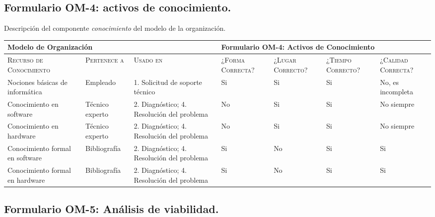 \documentclass[12pt,a4paper,twoside,spanish]{article}      %
\begin{document}
\subsection{Formulario OM-4: activos de conocimiento.}

Descripción del componente \textit{conocimiento} del modelo de la organización.


\begin{table}[H]
\scriptsize
\begin{tabularx}{\textwidth}{|p{1.3cm}|p{1.3cm}|p{1.3cm}|X|X|X|X|} \hline
\multicolumn{3}{|l}{\textbf{Modelo de Organización}} & \multicolumn{4}{|l|}{\textbf{Formulario OM-4: Activos de Conocimiento}} \\ \hline\hline
\textsc{Recurso de Conocimiento} & \textsc{Pertenece a} &  \textsc{Usado en} &  \textsc{¿Forma
Correcta?} & \textsc{¿Lugar Correcto?} & \textsc{¿Tiempo Correcto?} & \textsc{¿Calidad Correcta?}\\ \hline
Nociones básicas de informática
& Empleado
& 1. Solicitud de soporte técnico
& Si
& Si
& Si
& No, es incompleta
\\ 
\hline
Conoci\-miento en software
& Técnico experto
& 2. Diagnóstico; 4. Resolución del problema
& No
& Si
& Si
& No siempre
\\ 
\hline
Conoci\-miento en hardware
& Técnico experto
& 2. Diagnóstico; 4. Resolución del problema
& No
& Si
& Si
& No siempre
\\ 
\hline
Conoci\-miento formal en software
& Bibliografía
& 2. Diagnóstico; 4. Resolución del problema
& Si
& No
& Si
& Si
\\ 
\hline
Conoci\-miento formal en hardware
& Bibliografía
& 2. Diagnóstico; 4. Resolución del problema
& Si
& No
& Si
& Si
\\ 
\hline
\end{tabularx}

  \label{tab.OM4}
\end{table}


\subsection{Formulario OM-5: Análisis de viabilidad.}
\end{document}
